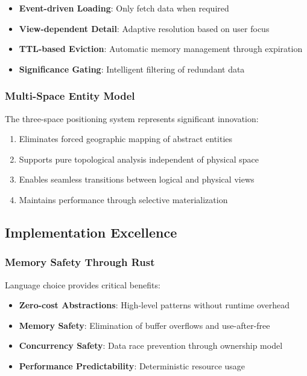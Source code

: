 \documentclass[12pt,a4paper]{article}
\begin{document}
\begin{itemize}
\item \textbf{Event-driven Loading}: Only fetch data when required
\item \textbf{View-dependent Detail}: Adaptive resolution based on user focus
\item \textbf{TTL-based Eviction}: Automatic memory management through expiration
\item \textbf{Significance Gating}: Intelligent filtering of redundant data
\end{itemize}

\subsubsection{Multi-Space Entity Model}
The three-space positioning system represents significant innovation:

\begin{enumerate}
\item Eliminates forced geographic mapping of abstract entities
\item Supports pure topological analysis independent of physical space
\item Enables seamless transitions between logical and physical views
\item Maintains performance through selective materialization
\end{enumerate}

\subsection{Implementation Excellence}

\subsubsection{Memory Safety Through Rust}
Language choice provides critical benefits:

\begin{itemize}
\item \textbf{Zero-cost Abstractions}: High-level patterns without runtime overhead
\item \textbf{Memory Safety}: Elimination of buffer overflows and use-after-free
\item \textbf{Concurrency Safety}: Data race prevention through ownership model
\item \textbf{Performance Predictability}: Deterministic resource usage
\end{itemize}
\end{document}
